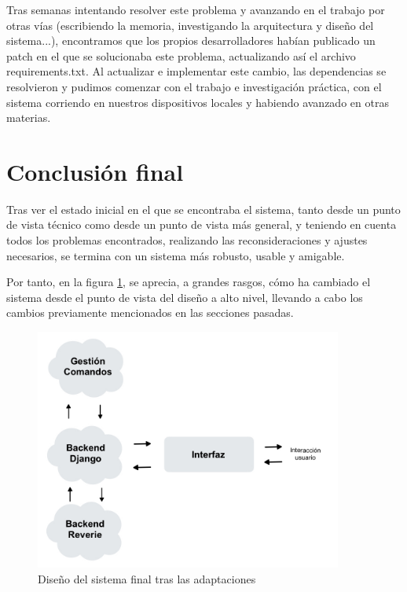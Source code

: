 Tras semanas intentando resolver este problema y avanzando en el trabajo por otras vías (escribiendo la memoria, investigando la arquitectura y diseño del sistema...), encontramos que los propios desarrolladores habían publicado un patch en el que se solucionaba este problema, actualizando así el archivo requirements.txt. Al actualizar e implementar este cambio, las dependencias se resolvieron y pudimos comenzar con el trabajo e investigación práctica, con el sistema corriendo en nuestros dispositivos locales y habiendo avanzado en otras materias.

\section{Conclusión final}

Tras ver el estado inicial en el que se encontraba el sistema, tanto desde un punto de vista técnico como desde un punto de vista más general, y teniendo en cuenta todos los problemas encontrados, realizando las reconsideraciones y ajustes necesarios, se termina con un sistema más robusto, usable y amigable.

Por tanto, en la figura \ref{fig:sistemaFinal}, se aprecia, a grandes rasgos, cómo ha cambiado el sistema desde el punto de vista del diseño a alto nivel, llevando a cabo los cambios previamente mencionados en las secciones pasadas.

\begin{figure}[h]
	\centering
	\includegraphics[width = 0.9\textwidth]{Imagenes/Vectorial/disenoSistemaFinal.jpeg}
	\caption{Diseño del sistema final tras las adaptaciones}
	\label{fig:sistemaFinal}
\end{figure}

